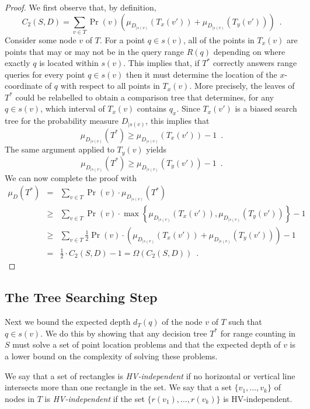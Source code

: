 \documentclass[charterfonts]{patmorin}
\begin{document}
\begin{proof}
We first observe that, by definition,
\[
  C_2(S,D) =  \sum_{v\in T} 
              \Pr(v)\left( \mu_{D_{\mid s(v)}}(T_x(v'))
                               +  \mu_{D_{\mid s(v)}}(T_y(v')) \right)
           \enspace .
\]
Consider some node $v$ of $T$.  For a point $q\in s(v)$, all of the
points in $T_x(v)$ are points that may or may not be in the query
range $R(q)$ depending on where exactly $q$ is located within $s(v)$.
This implies that, if $T^*$ correctly answers range queries for every
point $q\in s(v)$ then it must determine the location of the
$x$-coordinate of $q$ with respect to all points in $T_x(v)$.  More
precisely, the leaves of $T^*$ could be relabelled to obtain a
comparison tree that determines, for any $q\in s(v)$, which interval
of $T_x(v)$ contains $q_x$.  Since $T_x(v')$ is a biased search tree
for the probability measure $D_{\mid s(v)}$, this implies that
\[
  \mu_{D_{\mid s(v)}}(T^*) \ge \mu_{D_{\mid s(v)}}(T_x(v')) - 1\enspace .
\]
The same argument applied to $T_y(v)$ yields 
\[
  \mu_{D_{\mid s(v)}}(T^*) \ge \mu_{D_{\mid s(v)}}(T_y(v')) - 1\enspace .
\]
We can now complete the proof with
\begin{eqnarray*}
\mu_D(T^*) 
 & = & \sum_{v\in T} \Pr(v)\cdot\mu_{D_{\mid s(v)}}(T^*) \\
 & \ge & \sum_{v\in T}
	\Pr(v) \cdot\max\left\{\mu_{D_{\mid s(v)}}(T_x(v')), 
		       \mu_{D_{\mid s(v)}}(T_y(v'))\right\} - 1 \\
 & \ge & \sum_{v\in T}
	\frac{1}{2}\Pr(v)\cdot\left( \mu_{D_{\mid s(v)}}(T_x(v'))
                             +  \mu_{D_{\mid s(v)}}(T_y(v')) \right) - 1 \\
 & = & \frac{1}{2}\cdot C_2(S,D) - 1 = \Omega(C_2(S,D)) \enspace .
\end{eqnarray*}
\end{proof}

\subsection{The Tree Searching Step}

Next we bound the expected depth $d_T(q)$ of the node $v$ of $T$ such
that $q\in s(v)$.  We do this by showing that any decision tree $T^*$
for range counting in $S$ must solve a set of point location problems
and that the expected depth of $v$ is a lower bound on the complexity
of solving these problems.

We say that a set of rectangles is \emph{HV-independent} if no
horizontal or vertical line intersects more than one rectangle in the
set.  We say that a set $\{v_1,\ldots,v_k\}$ of nodes in $T$ is
\emph{HV-independent} if the set $\{r(v_1),\ldots,r(v_k)\}$ is
HV-independent.
\end{document}
